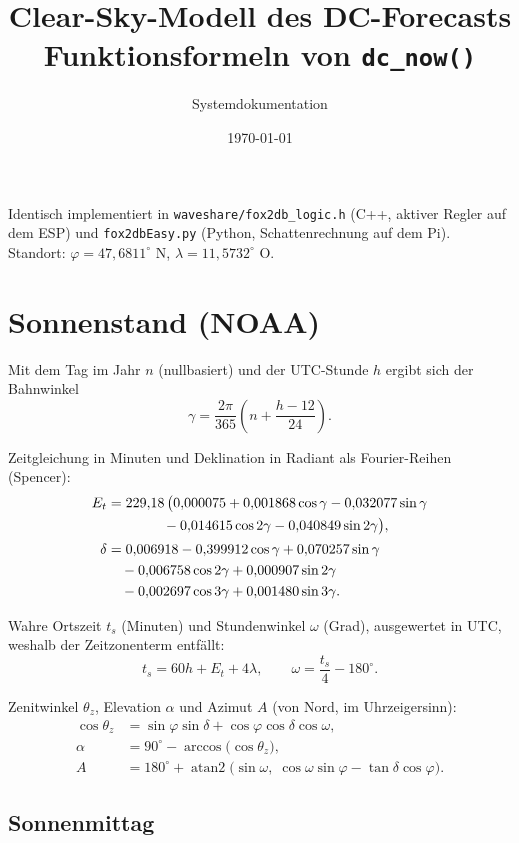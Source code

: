 \documentclass[11pt, a4paper]{article}
\title{Clear-Sky-Modell des DC-Forecasts\\\large Funktionsformeln von \texttt{dc\_now()}}
\author{Systemdokumentation}
\date{\today}
\begin{document}
\maketitle

\noindent
Identisch implementiert in \texttt{waveshare/fox2db\_logic.h} (C++, aktiver Regler
auf dem ESP) und \texttt{fox2dbEasy.py} (Python, Schattenrechnung auf dem Pi).
Standort: $\varphi = 47{,}6811^\circ$ N, $\lambda = 11{,}5732^\circ$ O.

\section{Sonnenstand (NOAA)}

Mit dem Tag im Jahr $n$ (nullbasiert) und der UTC-Stunde $h$ ergibt sich der
Bahnwinkel
\[
\gamma = \frac{2\pi}{365}\left(n + \frac{h-12}{24}\right).
\]

Zeitgleichung in Minuten und Deklination in Radiant als Fourier-Reihen
(Spencer):
\begin{align}
E_t &= 229{,}18\,\bigl(0{,}000075 + 0{,}001868\cos\gamma - 0{,}032077\sin\gamma \notag\\
    &\qquad\qquad - 0{,}014615\cos 2\gamma - 0{,}040849\sin 2\gamma\bigr),\\[2pt]
\delta &= 0{,}006918 - 0{,}399912\cos\gamma + 0{,}070257\sin\gamma \notag\\
    &\quad - 0{,}006758\cos 2\gamma + 0{,}000907\sin 2\gamma \notag\\
    &\quad - 0{,}002697\cos 3\gamma + 0{,}001480\sin 3\gamma .
\end{align}

Wahre Ortszeit $t_s$ (Minuten) und Stundenwinkel $\omega$ (Grad), ausgewertet in
UTC, weshalb der Zeitzonenterm entfällt:
\[
t_s = 60h + E_t + 4\lambda,
\qquad
\omega = \frac{t_s}{4} - 180^\circ .
\]

Zenitwinkel $\theta_z$, Elevation $\alpha$ und Azimut $A$ (von Nord, im
Uhrzeigersinn):
\begin{align}
\cos\theta_z &= \sin\varphi\sin\delta + \cos\varphi\cos\delta\cos\omega,\\
\alpha &= 90^\circ - \arccos\bigl(\cos\theta_z\bigr),\\
A &= 180^\circ + \operatorname{atan2}\bigl(\sin\omega,\;
     \cos\omega\sin\varphi - \tan\delta\cos\varphi\bigr).
\end{align}

\subsection*{Sonnenmittag}
\end{document}
